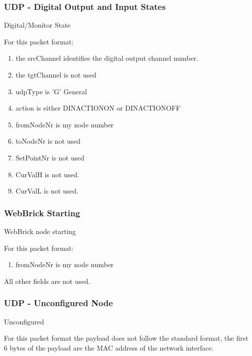 \subsubsection{UDP - Digital Output and Input States}
	
Digital/Monitor State


For this packet format:
\begin{enumerate}
\item  the srcChannel identifies the digital output channel number.
\item  the tgtChannel is not used
\item  udpType is 'G' General
\item  action is either DINACTIONON or DINACTIONOFF
\item  fromNodeNr is my node number
\item  toNodeNr is not used
\item  SetPointNr is not used
\item  CurValH is not used.
\item  CurValL is not used.\\
\end{enumerate}

\subsubsection{WebBrick Starting}

WebBrick node starting


For this packet format:
\begin{enumerate}
\item  fromNodeNr is my node number
\end{enumerate}
All other fields are not used.\\
	
\subsubsection{UDP - Unconfigured Node}

Unconfigured


For this packet format the payload does not follow the standard format, the first 6 bytes of the payload are 
the MAC address of the network interface.\\

